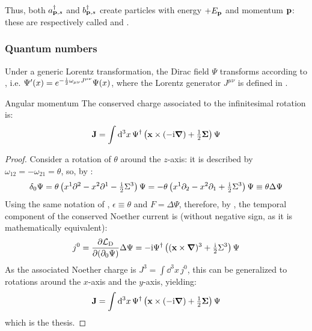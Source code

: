 Thus, both $ a_{\mathbf{p},s}^\dagger $ and $ b_{\mathbf{p},s}^\dagger $ create particles with energy $ +E_{\mathbf{p}} $ and momentum $ \mathbf{p} $: these are respectively called  and .

\subsubsection{Quantum numbers}

Under a generic Lorentz transformation, the Dirac field $ \Psi $ transforms according to , i.e. $ \Psi'(x) = e^{-\frac{\mathrm{i}}{2} \omega_{\mu \nu} J^{\mu \nu}} \Psi(x) $, where the Lorentz generator $ J^{\mu \nu} $ is defined in .

\begin{proposition}{Angular momentum}{}
  The conserved charge associated to the infinitesimal rotation  is:
  \begin{equation}
    \mathbf{J} = \int \mathrm{d}^3x\, \Psi^\dagger \left( \mathbf{x} \times (-\mathrm{i} \boldsymbol{\nabla}) + \tfrac{1}{2} \boldsymbol{\Sigma} \right) \Psi
  \end{equation}
\end{proposition}

\begin{proofbox}
  \begin{proof}
    Consider a rotation of $ \theta $ around the $ z $-axis: it is described by $ \omega_{12} = - \omega_{21} = \theta $, so, by :
    \begin{equation*}
      \delta_0 \Psi = \theta \left( x^1 \partial^2 - x^2 \partial^1 - \tfrac{\mathrm{i}}{2} \Sigma^3 \right) \Psi = - \theta \left( x^1 \partial_2 - x^2 \partial_1 + \tfrac{\mathrm{i}}{2} \Sigma^3 \right) \Psi \equiv \theta \Delta \Psi
    \end{equation*}
    Using the same notation of , $ \epsilon \equiv \theta $ and $ F = \Delta \Psi $, therefore, by , the temporal component of the conserved Noether current is (without negative sign, as it is mathematically equivalent):
    \begin{equation*}
      j^0 = \frac{\partial \mathcal{L}_\text{D}}{\partial (\partial_0 \Psi)} \Delta \Psi = - \mathrm{i} \Psi^\dagger \left( (\mathbf{x} \times \boldsymbol{\nabla})^3 + \tfrac{\mathrm{i}}{2} \Sigma^3 \right) \Psi
    \end{equation*}
    As the associated Noether charge is $ J^3 = \int \dd^3x\, j^0 $, this can be generalized to rotations around the $ x $-axis and the $ y $-axis, yielding:
    \begin{equation*}
      \mathbf{J} = \int \mathrm{d}^3x\, \Psi^\dagger \left( \mathbf{x} \times (-\mathrm{i} \boldsymbol{\nabla}) + \tfrac{1}{2} \boldsymbol{\Sigma} \right) \Psi
    \end{equation*}
    which is the thesis.
  \end{proof}
\end{proofbox}

